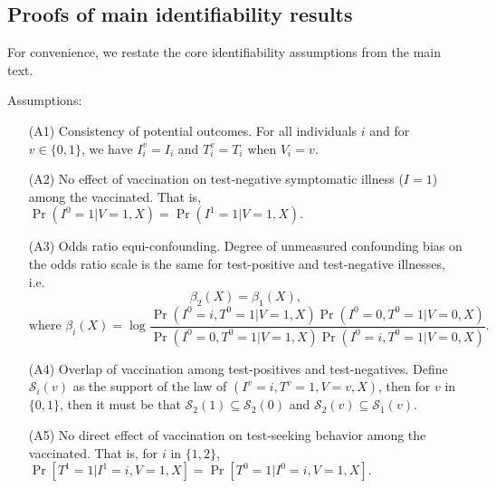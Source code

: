 
\begin{appendix}

    \renewcommand{\thefigure}{A\arabic{figure}}
    \setcounter{figure}{0}
    
    \renewcommand{\thetable}{A\arabic{table}}
    \setcounter{table}{0}
    
    \renewcommand{\theequation}{A\arabic{equation}}
    \setcounter{equation}{0}

    \singlespacing
    \newpage

    \section{Proofs of main identifiability results}
    For convenience, we restate the core identifiability assumptions from the main text. 
    \vspace{1em}
    
    \noindent Assumptions:
    \begin{itemize}
        \item[(A1)] Consistency of potential outcomes. For all individuals $i$ and for $v \in \{0, 1\}$, we have $I_i^v = I_i$ and $T_i^v = T_i$ when $V_i = v$.
        \item[(A2)] No effect of vaccination on test-negative symptomatic illness ($I = 1$) among the vaccinated. That is, $\Pr(I^0 = 1 | V = 1, X) = \Pr(I^1 = 1 | V = 1, X).$
        \item[(A3)] Odds ratio equi-confounding. Degree of unmeasured confounding bias on the odds ratio scale is the same for test-positive and test-negative illnesses, i.e. 
        $$\beta_2(X) = \beta_1(X), $$
        $$ \text{where } \beta_i(X) = \log \frac{\Pr(I^0 = i, T^0 = 1 | V = 1, X)\Pr(I^0 = 0, T^0 = 1 | V = 0, X)}{\Pr(I^0 = 0, T^0 = 1 | V = 1, X)\Pr(I^0 = i, T^0 = 1| V = 0, X)}.$$
        \item[(A4)] Overlap of vaccination among test-positives and test-negatives. Define $\mathcal{S}_i(v)$ as the support of the law of $(I^v = i, T^v = 1, V = v, X)$, then for $v$ in $\{0,1\}$, then it must be that $\mathcal{S}_2(1) \subseteq \mathcal{S}_2(0)$ and $\mathcal{S}_2(v) \subseteq \mathcal{S}_1(v).$
        \item[(A5)] No direct effect of vaccination on test-seeking behavior among the vaccinated. That is, for $i$ in $\{1,2\}$, $\Pr[T^1 = 1 | I^1 = i, V = 1, X] = \Pr[T^0 = 1 | I^0 = i, V = 1, X].$
    \end{itemize}


\end{appendix}
